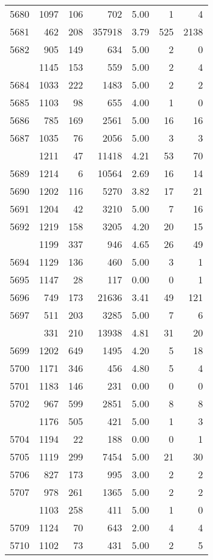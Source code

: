 \documentclass[
]{article}
\begin{document}
\begin{table}
\begin{tabular}[t]{lrrrrrr}
5680 & 1097 & 106 & 702 & 5.00 & 1 & 4\\
5681 & 462 & 208 & 357918 & 3.79 & 525 & 2138\\
5682 & 905 & 149 & 634 & 5.00 & 2 & 0\\
\addlinespace
5683 & 1145 & 153 & 559 & 5.00 & 2 & 4\\
5684 & 1033 & 222 & 1483 & 5.00 & 2 & 2\\
5685 & 1103 & 98 & 655 & 4.00 & 1 & 0\\
5686 & 785 & 169 & 2561 & 5.00 & 16 & 16\\
5687 & 1035 & 76 & 2056 & 5.00 & 3 & 3\\
\addlinespace
5688 & 1211 & 47 & 11418 & 4.21 & 53 & 70\\
5689 & 1214 & 6 & 10564 & 2.69 & 16 & 14\\
5690 & 1202 & 116 & 5270 & 3.82 & 17 & 21\\
5691 & 1204 & 42 & 3210 & 5.00 & 7 & 16\\
5692 & 1219 & 158 & 3205 & 4.20 & 20 & 15\\
\addlinespace
5693 & 1199 & 337 & 946 & 4.65 & 26 & 49\\
5694 & 1129 & 136 & 460 & 5.00 & 3 & 1\\
5695 & 1147 & 28 & 117 & 0.00 & 0 & 1\\
5696 & 749 & 173 & 21636 & 3.41 & 49 & 121\\
5697 & 511 & 203 & 3285 & 5.00 & 7 & 6\\
\addlinespace
5698 & 331 & 210 & 13938 & 4.81 & 31 & 20\\
5699 & 1202 & 649 & 1495 & 4.20 & 5 & 18\\
5700 & 1171 & 346 & 456 & 4.80 & 5 & 4\\
5701 & 1183 & 146 & 231 & 0.00 & 0 & 0\\
5702 & 967 & 599 & 2851 & 5.00 & 8 & 8\\
\addlinespace
5703 & 1176 & 505 & 421 & 5.00 & 1 & 3\\
5704 & 1194 & 22 & 188 & 0.00 & 0 & 1\\
5705 & 1119 & 299 & 7454 & 5.00 & 21 & 30\\
5706 & 827 & 173 & 995 & 3.00 & 2 & 2\\
5707 & 978 & 261 & 1365 & 5.00 & 2 & 2\\
\addlinespace
5708 & 1103 & 258 & 411 & 5.00 & 1 & 0\\
5709 & 1124 & 70 & 643 & 2.00 & 4 & 4\\
5710 & 1102 & 73 & 431 & 5.00 & 2 & 5\\

\end{tabular}
\end{table}
\end{document}
